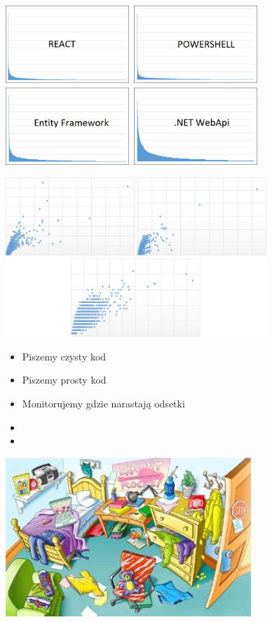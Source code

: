 \documentclass{beamer}
\begin{document}
\begin{frame}{}
\begin{center}
  	\includegraphics[height=6cm]{git_log5.png}
\end{center}
\end{frame}

\begin{frame}{}
\begin{center}
  	\includegraphics[height=6cm]{git_advanced.png}
\end{center}
\end{frame}

\begin{frame}{}
     \begin{Large}
	\begin{itemize}
		\item Piszemy czysty kod
		\item Piszemy prosty kod
		\item Monitorujemy gdzie narastają odsetki
		\item 
		\item 
	\end{itemize}
     \end{Large}
\end{frame}

\begin{frame}{}
\begin{center}
  	\includegraphics[height=6cm]{mess.jpeg}
\end{center}
\end{frame}
\end{document}
